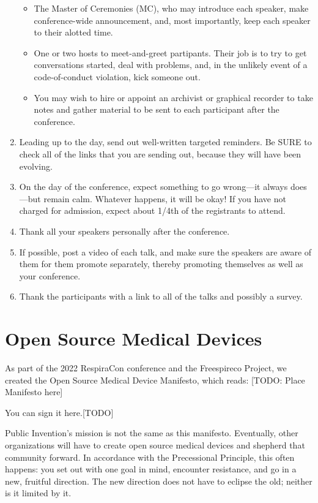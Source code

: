 \documentclass[
	fontsize=10pt, %
	twoside=false, %
	secnumdepth=1, %
]{kaobook}
\begin{document}
\begin{enumerate}
  \begin{itemize}
  \item The Master of Ceremonies (MC), who may introduce each speaker, make conference-wide announcement, and,
    most importantly, keep each speaker to their alotted time.
  \item One or two hosts to meet-and-greet partipants. Their job is to try to get conversations started,
    deal with problems, and, in the unlikely event of a code-of-conduct violation, kick someone out.
  \item You may wish to hire or appoint an archivist or graphical recorder to take notes and gather
    material to be sent to each participant after the conference.
  \end{itemize}
\item Leading up to the day, send out well-written targeted reminders. Be SURE to check all of the links
  that you are sending out, because they will have been evolving.
\item On the day of the conference, expect something to go wrong---it always does---but remain calm.
  Whatever happens, it will be okay! If you have not charged for admission, expect about 1/4th of the
  registrants to attend.
\item Thank all your speakers personally after the conference.
\item If possible, post a video of each talk, and make sure the speakers are aware of them
  for them promote separately, thereby promoting themselves as well as your conference.
\item Thank the participants with a link to all of the talks and possibly a survey.
\end{enumerate}

\section{Open Source Medical Devices}

As part of the 2022 RespiraCon conference and the Freespireco Project, we created
the Open Source Medical Device Manifesto, which reads:
[TODO: Place Manifesto here]

You can sign it here.[TODO]

Public Invention's mission is not the same as this manifesto. Eventually,
other organizations will have to create open source medical devices and shepherd
that community forward.
In accordance with the Precessional Principle, this often happens: you set out
with one goal in mind, encounter resistance, and go in a new, fruitful direction.
The new direction does not have to eclipse the old; neither is it limited by it.
\end{document}

